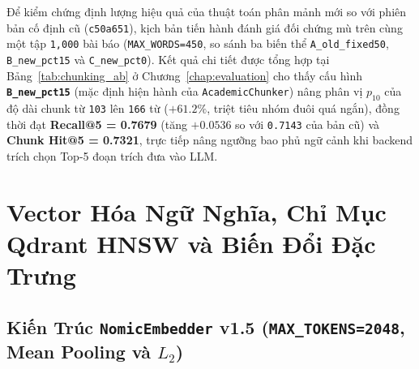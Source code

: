 Để kiểm chứng định lượng hiệu quả của thuật toán phân mảnh mới so với phiên bản cố định cũ (\texttt{c50a651}), kịch bản  tiến hành đánh giá đối chứng mù trên cùng một tập \texttt{1,000} bài báo (\texttt{MAX\_WORDS=450}, so sánh ba biến thể \texttt{A\_old\_fixed50}, \texttt{B\_new\_pct15} và \texttt{C\_new\_pct0}). Kết quả chi tiết được tổng hợp tại Bảng~\ref{tab:chunking_ab} ở Chương~\ref{chap:evaluation} cho thấy cấu hình \textbf{\texttt{B\_new\_pct15}} (mặc định hiện hành của \texttt{AcademicChunker}) nâng phân vị $p_{10}$ của độ dài chunk từ \texttt{103} lên \texttt{166} từ ($+61.2\%$, triệt tiêu nhóm đuôi quá ngắn), đồng thời đạt \textbf{Recall@5 = 0.7679} (tăng $+0.0536$ so với \texttt{0.7143} của bản cũ) và \textbf{Chunk Hit@5 = 0.7321}, trực tiếp nâng ngưỡng bao phủ ngữ cảnh khi backend trích chọn Top-5 đoạn trích đưa vào LLM.

\section{Vector Hóa Ngữ Nghĩa, Chỉ Mục Qdrant HNSW và Biến Đổi Đặc Trưng}
\label{sec:ch2_embed_index_fe}

\subsection{Kiến Trúc \texttt{NomicEmbedder} v1.5 (\texttt{MAX\_TOKENS=2048}, Mean Pooling và \texorpdfstring{$L_2$}{L2})}
\label{sec:ch2_nomic}

